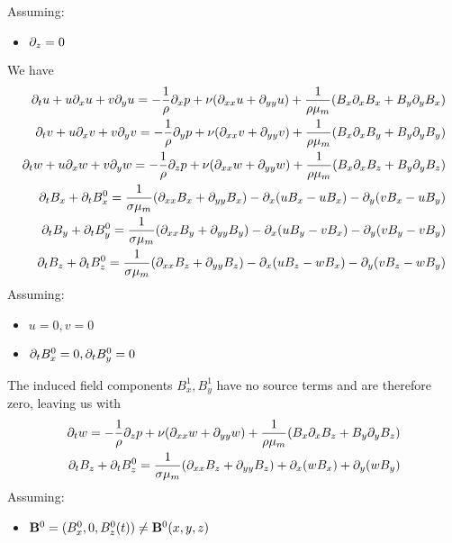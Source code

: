 \documentclass[11pt]{article}
\begin{document}
Assuming:
\begin{itemize}\setlength\itemsep{-1em}
	\item $\partial_z=0$
\end{itemize}
We have
\begin{equation}\begin{aligned}
\partial_t u+ u\partial_x u + v\partial_y u = -\frac{1}{\rho}\partial_x p+ \nu (\partial_{xx}u+\partial_{yy}u) + \frac{1}{\rho {\mu_m}} (B_x \partial_x B_x + B_y \partial_y B_x) \\
\partial_t v+ u\partial_x v + v\partial_y v = -\frac{1}{\rho}\partial_y p+ \nu (\partial_{xx}v+\partial_{yy}v) + \frac{1}{\rho {\mu_m}} (B_x \partial_x B_y + B_y \partial_y B_y) \\
\partial_t w+ u\partial_x w + v\partial_y w = -\frac{1}{\rho}\partial_z p+ \nu (\partial_{xx}w+\partial_{yy}w) + \frac{1}{\rho {\mu_m}} (B_x \partial_x B_z + B_y \partial_y B_z) \\
\partial_t B_x + \partial_t B_x^0 = \frac{1}{\sigma {\mu_m}} (\partial_{xx} B_x + \partial_{yy} B_x) - \partial_x (u B_x - u B_x) - \partial_y (v B_x - u B_y) \\
\partial_t B_y + \partial_t B_y^0 = \frac{1}{\sigma {\mu_m}} (\partial_{xx} B_y + \partial_{yy} B_y) - \partial_x (u B_y - v B_x) - \partial_y (v B_y - v B_y) \\
\partial_t B_z + \partial_t B_z^0 = \frac{1}{\sigma {\mu_m}} (\partial_{xx} B_z + \partial_{yy} B_z) - \partial_x (u B_z - w B_x) - \partial_y (v B_z - w B_y) \\
\end{aligned} \end{equation}
Assuming:
\begin{itemize}\setlength\itemsep{-1em}
	\item $u=0,v=0$
	\item $\partial_t B_x^0 = 0, \partial_t B_y^0 = 0$
\end{itemize}
The induced field components $B_x^1,B_y^1$ have no source terms and are therefore zero, leaving us with
\begin{equation}\begin{aligned}
\partial_t w = -\frac{1}{\rho}\partial_z p+ \nu (\partial_{xx}w+\partial_{yy}w) + \frac{1}{\rho {\mu_m}} (B_x \partial_x B_z + B_y \partial_y B_z) \\
\partial_t B_z + \partial_t B_z^0 = \frac{1}{\sigma {\mu_m}} (\partial_{xx} B_z + \partial_{yy} B_z) + \partial_x (w B_x) + \partial_y (w B_y) \\
\end{aligned} \end{equation}
Assuming:
\begin{itemize}\setlength\itemsep{-1em}
	\item $\mathbf{B}^0 = (B_x^0,0,B_z^0(t)) \ne \mathbf{B}^0(x,y,z)$
\end{itemize}
\end{document}

